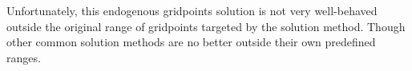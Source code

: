 Unfortunately, this endogenous gridpoints solution is not very well-behaved outside the original range of gridpoints targeted by the solution method.  Though other common solution methods are no better outside their own predefined ranges.  %
  
